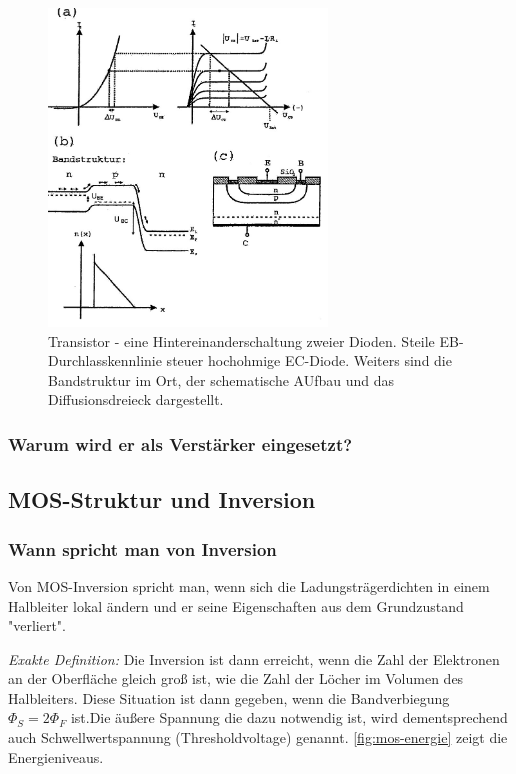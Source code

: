     \begin{figure}
        \centering
        \includegraphics[width=0.66\textwidth]{fig/npn-transistor-kennlinien.jpg}
        \caption{Transistor - eine Hintereinanderschaltung zweier Dioden. Steile EB-Durchlasskennlinie steuer hochohmige EC-Diode. Weiters sind die Bandstruktur im Ort, der schematische AUfbau und das Diffusionsdreieck dargestellt.}
        \label{fig:npnTransistorKennlinie}
    \end{figure}
    
    \subsubsection{Warum wird er als Verst\"arker eingesetzt?}
     
    
\subsection{MOS-Struktur und Inversion }\label{k6:mosInversion}

    \subsubsection{Wann spricht man von Inversion}
    Von MOS-Inversion spricht man, wenn sich die Ladungsträgerdichten in einem Halbleiter lokal ändern und er seine Eigenschaften aus dem Grundzustand "verliert".
    
    \emph{Exakte Definition:} Die Inversion ist dann erreicht, wenn die Zahl der Elektronen an der Oberfläche gleich groß ist, wie die Zahl der Löcher im Volumen des Halbleiters. Diese Situation ist dann gegeben, wenn die Bandverbiegung $\Phi_S = 2\Phi_F$ ist.Die äußere Spannung die dazu notwendig ist, wird dementsprechend auch Schwellwertspannung (Thresholdvoltage) genannt. \autoref{fig:mos-energie} zeigt die Energieniveaus.
    
